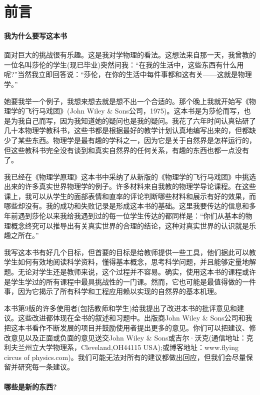 
\chapter{前言}




\subsubsection*{我为什么要写这本书}


面对巨大的挑战很有乐趣。这是我对学物理的看法。这想法来自那一天，我曾教的一位名叫莎伦的学生(现已毕业)突然问我：“在我的生活中，这些东西有什么用呢?”当然我立即回答说：“莎伦，在你的生活中每件事都和这有关——这就是物理学。”

她要我举一个例子，我想来想去就是想不出一个合适的。那个晚上我就开始写《物理学的飞行马戏团》(John Wiley \& Sons公司，1975)。这本书是为莎伦而写，也是为我自己而写，因为我知道她的疑问也是我的疑问。我花了六年时间认真钻研了几十本物理学教科书，这些书都是根据最好的教学计划认真地编写出来的，但都缺少了某些东西。物理学是最有趣的学科之一，因为它是关于自然界是怎样运行的，但这些教科书完全没有谈到和真实自然界的任何关系，有趣的东西也都一点没有了。

我已经在《物理学原理》这本书中采纳了从新版的《物理学的飞行马戏团》中挑选出来的许多真实世界物理学的例子。许多材料来自我教的物理学导论课程。在这些课上，我可以从学生的面部表情和直率的评论判断哪些材料和展示有好的效果，而哪些却没有。我的成功和失败记录是形成这本书的基础。这里我要传达的信息和多年前遇到莎伦以来我给我遇到过的每一位学生传达的都同样是：“你们从基本的物理概念终究可以推导出有关真实世界的合理的结论，这种对真实世界的认识就是乐趣之所在。”

我写这本书有好几个目标，但首要的目标是给教师提供一些工具，他们据此可以教学生如何有效地阅读科学资料，懂得基本概念，思考科学问题，并且能够定量地解题。无论对学生还是教师来说，这个过程并不容易。确实，使用这本书的课程或许是学生学过的所有课程中最具挑战性的一门课。然而，它也可能是最值得做的一件事，因为它揭示了所有科学和工程应用赖以实现的自然界的基本机理。

本书第9版的许多使用者(包括教师和学生)给我提出了改进本书的批评意见和建议。这些改进都体现在全书的叙述和习题中。出版商John Wiley \& Sons公司和我把这本书看作不断发展的项目并鼓励使用者提出更多的意见。你们可以把建议、修改意见以及正面或负面的意见送交John Wiley \& Sons或吉尔·沃克(通信地址：克利夫兰州立大学物理系，Cleveland,OH44115 USA);或博客地址：www.flying circus of physics.com)。我们可能无法对所有的建议都做出回应，但我们会尽量保留并研究每一条建议。


\subsubsection*{哪些是新的东西?}
